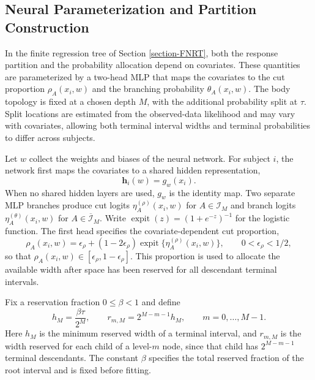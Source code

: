 \documentclass[11pt]{article}
\numberwithin{equation}{section}
\begin{document}
\subsection{Neural Parameterization and Partition Construction}
\label{section-neural-parameterization}
In the finite regression tree of Section \ref{section-FNRT}, both the response partition and the probability allocation depend on covariates. These quantities are parameterized by a two-head MLP that maps the covariates to the cut proportion $\rho_A(x_i,w)$ and the branching probability $\theta_A(x_i,w)$. The body topology is fixed at a chosen depth $M$, with the additional probability split at $\tau$. Split locations are estimated from the observed-data likelihood and may vary with covariates, allowing both terminal interval widths and terminal probabilities to differ across subjects.

Let $w$ collect the weights and biases of the neural network. For subject $i$, the network first maps the covariates to a shared hidden representation,
$$
    \bm h_i(w)=g_w(x_i).
$$
When no shared hidden layers are used, $g_w$ is the identity map. Two separate MLP branches produce cut logits $\eta_A^{(\rho)}(x_i,w)$ for $A\in\mathcal I_M$ and branch logits $\eta_A^{(\theta)}(x_i,w)$ for $A\in\overline{\mathcal I}_M$. Write $\operatorname{expit}(z)=(1+e^{-z})^{-1}$ for the logistic function. The first head specifies the covariate-dependent cut proportion,
\begin{equation}
    \label{eq:cut_prop}
    \rho_A(x_i,w)
    =
    \epsilon_\rho + (1-2\epsilon_\rho) \operatorname{expit}\{\eta_A^{(\rho)}(x_i,w)\},
    \qquad 0 < \epsilon_\rho < 1/2,
\end{equation}
so that $\rho_A(x_i,w)\in[\epsilon_\rho,1-\epsilon_\rho]$. This proportion is used to allocate the available width after space has been reserved for all descendant terminal intervals.

Fix a reservation fraction $0\leq\beta<1$ and define
\begin{equation}
    h_M=\frac{\beta\tau}{2^M},\qquad
    r_{m,M}=2^{M-m-1}h_M,\qquad m=0,\ldots,M-1.
    \label{eq:width-reservation}
\end{equation}
Here $h_M$ is the minimum reserved width of a terminal interval, and $r_{m,M}$ is the width reserved for each child of a level-$m$ node, since that child has $2^{M-m-1}$ terminal descendants. The constant $\beta$ specifies the total reserved fraction of the root interval and is fixed before fitting. 
\end{document}
